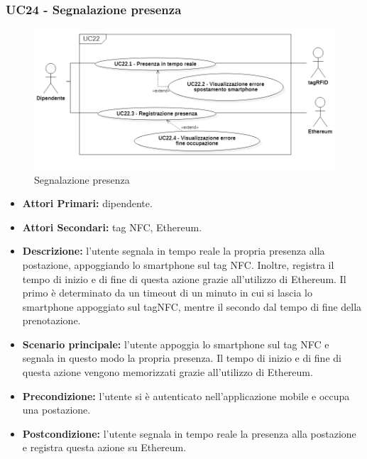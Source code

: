 \subsubsection{ UC24 - Segnalazione presenza}
\begin{figure}[H]
	\centering
	\includegraphics[width=15cm]{res/images/UC21.png}
	\caption{Segnalazione presenza}
	\label{fig:Segnalazione presenza}
\end{figure}
\begin{itemize}
	\item\textbf{Attori Primari:} dipendente.
	\item\textbf{Attori Secondari:} tag NFC, Ethereum.
	\item\textbf{Descrizione:} l’utente segnala in tempo reale la propria presenza alla postazione, appoggiando lo smartphone sul tag NFC. Inoltre, registra il tempo di inizio e di fine di questa azione grazie all'utilizzo di Ethereum. Il primo è determinato da un timeout di un minuto in cui si lascia lo smartphone appoggiato sul tagNFC, mentre il secondo dal tempo di fine della prenotazione.
	\item\textbf{Scenario principale:} l’utente appoggia lo smartphone sul tag NFC e segnala in questo modo la propria presenza.
	Il tempo di inizio e di fine di questa azione vengono memorizzati grazie all'utilizzo di Ethereum.
	\item\textbf{Precondizione:} l’utente si è autenticato nell'applicazione mobile e occupa una postazione.
	\item\textbf{Postcondizione:} l’utente segnala in tempo reale la presenza alla postazione e registra questa azione su Ethereum.
\end{itemize}



